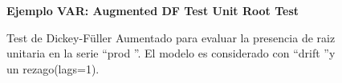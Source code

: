 
	\begin{figure}[H]
		\centering
		\textbf{Ejemplo VAR: Augmented DF Test Unit Root Test}\par\medskip
		\caption{Test de Dickey-Füller Aumentado para evaluar la presencia de raiz unitaria en la serie  \textquotedblleft prod \textquotedblright. El modelo es considerado con \textquotedblleft drift \textquotedblright y un rezago(lags=1).}\label{figd17}
	\end{figure}
	

